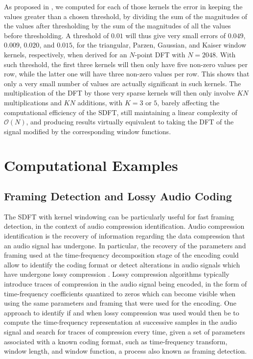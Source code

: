 \documentclass[journal]{IEEEtran}
\begin{document}
As proposed in \cite{brown1992}, we computed for each of those kernels the error in keeping the values greater than a chosen threshold, by dividing the sum of the magnitudes of the values after thresholding by the sum of the magnitudes of all the values before thresholding. A threshold of $0.01$ will thus give very small errors of $0.049$, $0.009$, $0.020$, and $0.015$, for the triangular, Parzen, Gaussian, and Kaiser window kernels, respectively, when derived for an $N$-point DFT with $N = 2048$. With such threshold, the first three kernels will then only have five non-zero values per row, while the latter one will have three non-zero values per row. This shows that only a very small number of values are actually significant in such kernels. The multiplication of the DFT by those very sparse kernels will then only involve $KN$ multiplications and $KN$ additions, with $K=3$ or $5$, barely affecting the computational efficiency of the SDFT, still maintaining a linear complexity of $\mathcal{O}(N)$, and producing results virtually equivalent to taking the DFT of the signal modified by the corresponding window functions.


\section{Computational Examples}

\subsection{Framing Detection and Lossy Audio Coding}

The SDFT with kernel windowing can be particularly useful for fast framing detection, in the context of audio compression identification. Audio compression identification is the recovery of information regarding the data compression that an audio signal has undergone. In particular, the recovery of the parameters and framing used at the time-frequency decomposition stage of the encoding could allow to identify the coding format or detect alterations in audio signals which have undergone lossy compression \cite{herre2000,moehrs2002,yang2008,gartner2014,kim2018}. Lossy compression algorithms typically introduce traces of compression in the audio signal being encoded, in the form of time-frequency coefficients quantized to zeros which can become visible when using the same parameters and framing that were used for the encoding. One approach to identify if and when lossy compression was used would then be to compute the time-frequency representation at successive samples in the audio signal and search for traces of compression every time, given a set of parameters associated with a known coding format, such as time-frequency transform, window length, and window function, a process also known as framing detection. 
\end{document}
